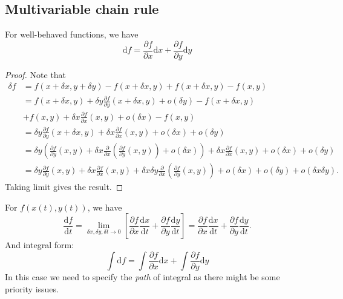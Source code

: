 \documentclass[10pt]{article}
\def\d{{\mathrm d}}
\begin{document}
        \subsection{Multivariable chain rule}
        \begin{theorem}\label{thm:mvchainrule}
            For well-behaved functions, we have 
            \begin{equation}
                \d f=\frac{\partial f}{\partial x} \d x+\frac{\partial f}{\partial y} \d y
            \end{equation}
        \end{theorem}
        \begin{proof}
            Note that 
            \[
                \begin{aligned}
                     \delta f &= f(x+\delta x, y+\delta y)-f(x+\delta x, y)+f(x+\delta x, y)-f(x,y)\\
                     &= f(x+\delta x,y)+\delta y \frac{\partial f}{\partial y}(x+\delta x, y)+o(\delta y)-f(x+\delta x,y)\\
                     &+ f(x,y)+\delta x \frac{\partial f}{\partial x}(x,y)+o(\delta x)-f(x,y) \\
                     &= \delta y \frac{\partial f}{\partial y}(x+\delta x, y)+\delta x \frac{\partial f}{\partial x}(x,y)+o(\delta x)+o(\delta y)\\
                     &= \delta y \left( \frac{\partial f}{\partial y}(x,y)+\delta x \frac{\partial }{\partial x}\left( \frac{\partial f}{\partial y}(x,y)  \right)+o(\delta x)   \right)+\delta x \frac{\partial f}{\partial x}(x,y)+o(\delta x)+o(\delta y)\\
                     &= \delta y \frac{\partial f}{\partial y}(x,y)+\delta x \frac{\partial f}{\partial x}(x,y)+\delta x \delta y \frac{\partial }{\partial x}\left( \frac{\partial f}{\partial y}(x,y)  \right)+o(\delta x)+o(\delta y)+o(\delta x \delta y).
                \end{aligned}
            \]
            Taking limit gives the result.
        \end{proof}
        \begin{remark}
            For $ f(x(t),y(t)) $, we have
            \begin{equation}
                \frac{\d f}{\d t}=\lim _{\delta x, \delta y, \delta t\to 0}\left[\frac{\partial f}{\partial x} \frac{\d x}{\d t}+\frac{\partial f}{\partial y} \frac{\d y}{\d t}\right] = \frac{\partial f}{\partial x} \frac{\d x}{\d t}+\frac{\partial f}{\partial y} \frac{\d y}{\d t}.
            \end{equation}
            And integral form:
            \begin{equation}
                \int \d f=\int \frac{\partial f}{\partial x} \d x+\int \frac{\partial f}{\partial y} \d y
            \end{equation}
            In this case we need to specify the \textit{path} of integral as there might be some priority issues.
        \end{remark}
\end{document}
